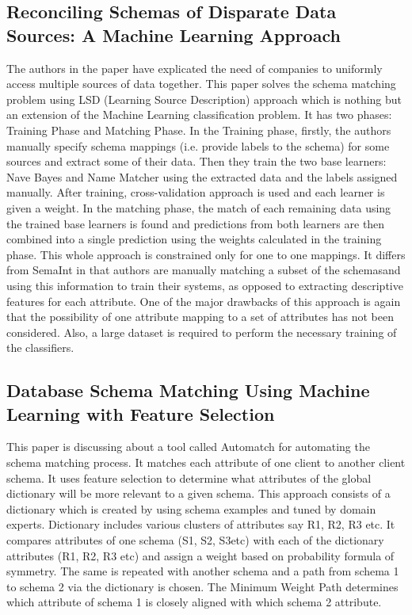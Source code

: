 \documentclass[conference]{IEEEtran}
\begin{document}
\subsection{\textbf{Reconciling Schemas of Disparate Data Sources: A Machine Learning Approach}}
The authors in the paper have explicated the need of companies to uniformly access multiple sources of data together. This paper solves the schema matching problem using
LSD (Learning Source Description) approach which is nothing but an extension of the Machine Learning
classification problem. It has two phases: Training Phase and Matching Phase. In the Training phase,
firstly, the authors manually specify schema mappings (i.e. provide labels to the schema) for some sources
and extract some of their data. Then they train the two base learners: Nave Bayes and Name Matcher
using the extracted data and the labels assigned manually. After training, cross-validation approach is
used and each learner is given a weight. In the matching phase, the match of each remaining data using
the trained base learners is found and predictions from both learners are then combined into a single
prediction using the weights calculated in the training phase. This whole approach is constrained only
for one to one mappings. It differs from SemaInt in that authors are manually matching a subset of the
schemasand using this information to train their systems, as opposed to extracting descriptive features
for each attribute.
One of the major drawbacks of this approach is again that the possibility of one attribute mapping
to a set of attributes has not been considered. Also, a large dataset is required to perform the necessary
training of the classifiers.
\subsection{\textbf{Database Schema Matching Using Machine Learning with Feature Selection}}
This paper is discussing about a tool called Automatch for automating the schema matching process. It
matches each attribute of one client to another client schema. It uses feature selection to determine what
attributes of the global dictionary will be more relevant to a given schema. This approach consists of a
dictionary which is created by using schema examples and tuned by domain experts. Dictionary includes
various clusters of attributes say R1, R2, R3 etc. It compares attributes of one schema (S1, S2, S3etc)
with each of the dictionary attributes (R1, R2, R3 etc) and assign a weight based on probability formula
of symmetry. The same is repeated with another schema and a path from schema 1 to schema 2 via
the dictionary is chosen. The Minimum Weight Path determines which attribute of schema 1 is closely
aligned with which schema 2 attribute.
\end{document}

